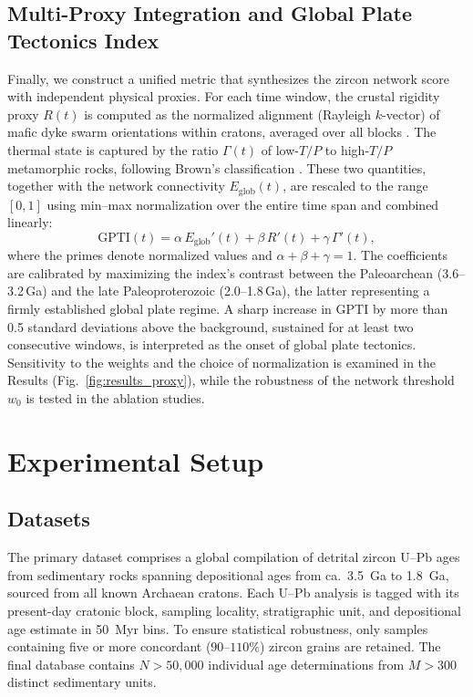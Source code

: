 \documentclass{article}
\begin{document}
\subsection{Multi-Proxy Integration and Global Plate Tectonics Index}
\label{sec:multi_proxy}
Finally, we construct a unified metric that synthesizes the zircon network score with independent physical proxies. For each time window, the crustal rigidity proxy $R(t)$ is computed as the normalized alignment (Rayleigh $k$-vector) of mafic dyke swarm orientations within cratons, averaged over all blocks \cite{swanson2024dyke}. The thermal state is captured by the ratio $\Gamma(t)$ of low-$T/P$ to high-$T/P$ metamorphic rocks, following Brown’s classification \cite{brown2020metamorphic}. These two quantities, together with the network connectivity $E_{\text{glob}}(t)$, are rescaled to the range $[0,1]$ using min–max normalization over the entire time span and combined linearly:
\begin{equation}
\text{GPTI}(t) = \alpha\,E_{\text{glob}}'(t) + \beta\,R'(t) + \gamma\,\Gamma'(t),
\label{eq:gpti}
\end{equation}
where the primes denote normalized values and $\alpha+\beta+\gamma=1$. The coefficients are calibrated by maximizing the index’s contrast between the Paleoarchean (3.6–3.2\,Ga) and the late Paleoproterozoic (2.0–1.8\,Ga), the latter representing a firmly established global plate regime. A sharp increase in GPTI by more than 0.5 standard deviations above the background, sustained for at least two consecutive windows, is interpreted as the onset of global plate tectonics. Sensitivity to the weights and the choice of normalization is examined in the Results (Fig.~\ref{fig:results_proxy}), while the robustness of the network threshold $w_0$ is tested in the ablation studies.

\section{Experimental Setup}

\subsection{Datasets}
The primary dataset comprises a global compilation of detrital zircon U–Pb ages from sedimentary rocks spanning depositional ages from ca.\ 3.5~Ga to 1.8~Ga, sourced from all known Archaean cratons. Each U–Pb analysis is tagged with its present-day cratonic block, sampling locality, stratigraphic unit, and depositional age estimate in 50~Myr bins. To ensure statistical robustness, only samples containing five or more concordant ($90$–$110\%$) zircon grains are retained. The final database contains $N > 50,000$ individual age determinations from $M > 300$ distinct sedimentary units.
\end{document}
